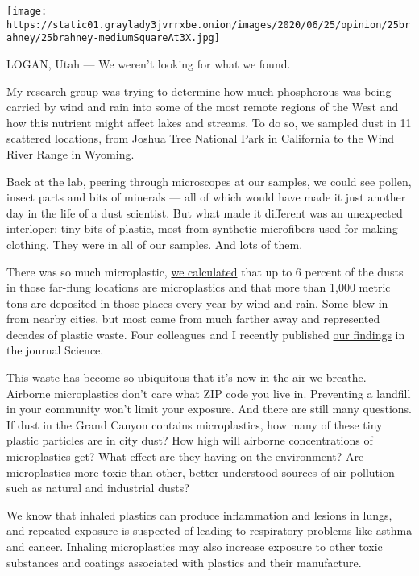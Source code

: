 \texttt{[image: https://static01.graylady3jvrrxbe.onion/images/2020/06/25/opinion/25brahney/25brahney-mediumSquareAt3X.jpg]}

LOGAN, Utah --- We weren't looking for what we found.

My research group was trying to determine how much phosphorous was being
carried by wind and rain into some of the most remote regions of the
West and how this nutrient might affect lakes and streams. To do so, we
sampled dust in 11 scattered locations, from Joshua Tree National Park
in California to the Wind River Range in Wyoming.

Back at the lab, peering through microscopes at our samples, we could
see pollen, insect parts and bits of minerals --- all of which would
have made it just another day in the life of a dust scientist. But what
made it different was an unexpected interloper: tiny bits of plastic,
most from synthetic microfibers used for making clothing. They were in
all of our samples. And lots of them.

There was so much microplastic,
\href{https://science.sciencemag.org/content/368/6496/1257}{we
calculated} that up to 6 percent of the dusts in those far-flung
locations are microplastics and that more than 1,000 metric tons are
deposited in those places every year by wind and rain. Some blew in from
nearby cities, but most came from much farther away and represented
decades of plastic waste. Four colleagues and I recently published
\href{https://science.sciencemag.org/content/368/6496/1257}{our
findings} in the journal Science.

This waste has become so ubiquitous that it's now in the air we breathe.
Airborne microplastics don't care what ZIP code you live in. Preventing
a landfill in your community won't limit your exposure. And there are
still many questions. If dust in the Grand Canyon contains
microplastics, how many of these tiny plastic particles are in city
dust? How high will airborne concentrations of microplastics get? What
effect are they having on the environment? Are microplastics more toxic
than other, better-understood sources of air pollution such as natural
and industrial dusts?

We know that inhaled plastics can produce inflammation and lesions in
lungs, and repeated exposure is suspected of leading to respiratory
problems like asthma and cancer. Inhaling microplastics may also
increase exposure to other toxic substances and coatings associated with
plastics and their manufacture.

